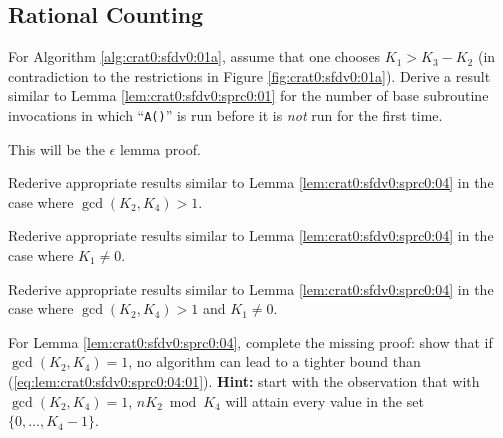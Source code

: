 \subsection{Rational Counting}


\begin{vworkexercisestatement}
\label{exe:crat0:sexe0:01}
For Algorithm \ref{alg:crat0:sfdv0:01a}, 
assume that one chooses $K_1 > K_3 - K_2$ (in contradiction to the
restrictions in Figure \ref{fig:crat0:sfdv0:01a}).
Derive a result similar to Lemma \ref{lem:crat0:sfdv0:sprc0:01}
for the number of base subroutine invocations in which 
``\texttt{A()}'' is run before it is
\emph{not} run for the first time.
\end{vworkexercisestatement}
\vworkexercisefooter{}

\begin{vworkexercisestatement}
\label{exe:crat0:sexe0:02}
This will be the $\epsilon$ lemma proof.
\end{vworkexercisestatement}
\vworkexercisefooter{}

\begin{vworkexercisestatement}
\label{exe:crat0:sexe0:03}
Rederive appropriate results similar to 
Lemma \ref{lem:crat0:sfdv0:sprc0:04} in the case where 
$\gcd(K_2, K_4) > 1$.
\end{vworkexercisestatement}
\vworkexercisefooter{}

\begin{vworkexercisestatement}
\label{exe:crat0:sexe0:04}
Rederive appropriate results similar to
Lemma \ref{lem:crat0:sfdv0:sprc0:04} in the case where 
$K_1 \neq 0$.
\end{vworkexercisestatement}
\vworkexercisefooter{}

\begin{vworkexercisestatement}
\label{exe:crat0:sexe0:05}
Rederive appropriate results similar to
Lemma \ref{lem:crat0:sfdv0:sprc0:04} in the case where 
$\gcd(K_2, K_4) > 1$ and $K_1 \neq 0$.
\end{vworkexercisestatement}
\vworkexercisefooter{}

\begin{vworkexercisestatement}
\label{exe:crat0:sexe0:06}
For Lemma \ref{lem:crat0:sfdv0:sprc0:04},
complete the missing proof:
show that if $\gcd(K_2, K_4) = 1$, no algorithm can
lead to a tighter bound than (\ref{eq:lem:crat0:sfdv0:sprc0:04:01}).
\textbf{Hint:} start with the observation
that with
$\gcd(K_2, K_4) = 1$, $n K_2 \bmod K_4$ will attain every value in
the set $\{ 0, \ldots , K_4-1 \}$.
\end{vworkexercisestatement}
\vworkexercisefooter{}

